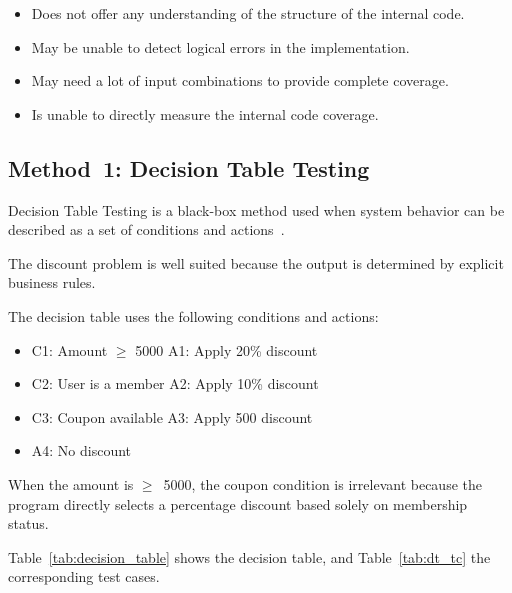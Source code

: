 \documentclass[conference]{IEEEtran}
\begin{document}
\begin{itemize}

\item Does not offer any understanding of the structure of the internal code.

\item May be unable to detect logical errors in the implementation.

\item May need a lot of input combinations to provide complete coverage.

\item Is unable to directly measure the internal code coverage.

\end{itemize}



\subsection{Method~1: Decision Table Testing}

Decision Table Testing is a black-box method used when system behavior can be described as a set of conditions and actions~\cite{alshamaa2025,maspupah2025}.

The discount problem is well suited because the output is determined by explicit business rules.



The decision table uses the following conditions and actions:

\begin{itemize}

\item C1: Amount $\geq$ 5000 \quad\quad A1: Apply 20\% discount

\item C2: User is a member \quad\quad A2: Apply 10\% discount

\item C3: Coupon available \quad\quad A3: Apply 500 discount

\item \hfill A4: No discount

\end{itemize}



When the amount is $\geq$~5000, the coupon condition is irrelevant because the program directly selects a percentage discount based solely on membership status.



Table~\ref{tab:decision_table} shows the decision table, and Table~\ref{tab:dt_tc} the corresponding test cases.
\end{document}
